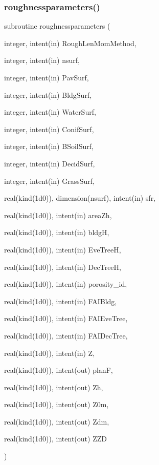 \subsubsection{\texorpdfstring{roughnessparameters()}{roughnessparameters()}}
{\footnotesize\ttfamily subroutine roughnessparameters (\begin{DoxyParamCaption}\item[{integer, intent(in)}]{Rough\+Len\+Mom\+Method,  }\item[{integer, intent(in)}]{nsurf,  }\item[{integer, intent(in)}]{Pav\+Surf,  }\item[{integer, intent(in)}]{Bldg\+Surf,  }\item[{integer, intent(in)}]{Water\+Surf,  }\item[{integer, intent(in)}]{Conif\+Surf,  }\item[{integer, intent(in)}]{B\+Soil\+Surf,  }\item[{integer, intent(in)}]{Decid\+Surf,  }\item[{integer, intent(in)}]{Grass\+Surf,  }\item[{real(kind(1d0)), dimension(nsurf), intent(in)}]{sfr,  }\item[{real(kind(1d0)), intent(in)}]{area\+Zh,  }\item[{real(kind(1d0)), intent(in)}]{bldgH,  }\item[{real(kind(1d0)), intent(in)}]{Eve\+TreeH,  }\item[{real(kind(1d0)), intent(in)}]{Dec\+TreeH,  }\item[{real(kind(1d0)), intent(in)}]{porosity\+\_\+id,  }\item[{real(kind(1d0)), intent(in)}]{F\+A\+I\+Bldg,  }\item[{real(kind(1d0)), intent(in)}]{F\+A\+I\+Eve\+Tree,  }\item[{real(kind(1d0)), intent(in)}]{F\+A\+I\+Dec\+Tree,  }\item[{real(kind(1d0)), intent(in)}]{Z,  }\item[{real(kind(1d0)), intent(out)}]{planF,  }\item[{real(kind(1d0)), intent(out)}]{Zh,  }\item[{real(kind(1d0)), intent(out)}]{Z0m,  }\item[{real(kind(1d0)), intent(out)}]{Zdm,  }\item[{real(kind(1d0)), intent(out)}]{Z\+ZD }\end{DoxyParamCaption})}



